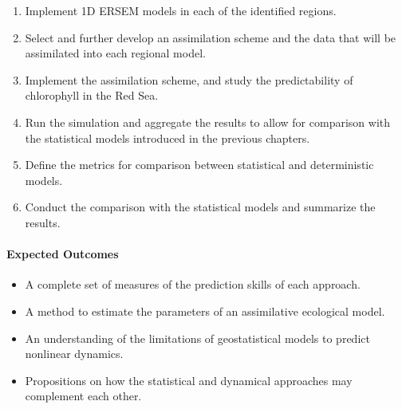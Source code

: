 \begin{enumerate}

\item Implement 1D ERSEM models in each of the identified regions.

\item Select and further develop an assimilation scheme and the data that will
be assimilated into each regional model.

\item Implement the assimilation scheme, and study the predictability of
chlorophyll in the Red Sea.

\item Run the simulation and aggregate the results to allow for comparison with
the statistical models introduced in the previous chapters.

\item Define the metrics for comparison between statistical and deterministic
models.

\item Conduct the comparison with the statistical models and summarize the
results.

\end{enumerate}

\paragraph{Expected Outcomes}

\begin{itemize}

\item A complete set of measures of the prediction skills of each approach.

\item A method to estimate the parameters of an assimilative ecological model.

\item An understanding of the limitations of geostatistical models to predict
nonlinear dynamics. 

\item Propositions on how the statistical and dynamical approaches may
complement each other.

\end{itemize}
